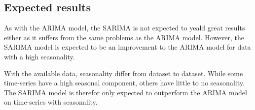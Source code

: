   \subsection{Expected results}
  As with the ARIMA model, the SARIMA is not expected to yeald great results either as it suffers from the same problems as the ARIMA model.
  However, the SARIMA model is expected to be an improvement to the ARIMA model for data with a high seasonality.

  With the available data, seasonality differ from dataset to dataset. While some time-series have a high seasonal component,
  others have little to no seasonality.
  The SARIMA model is therefor only expected to outperform the ARIMA model on time-series with seasonality.

\fi